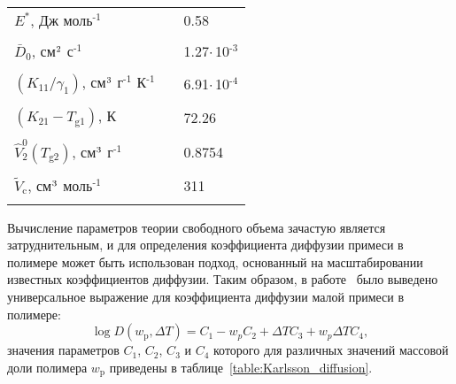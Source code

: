 \begin{table}[h]
\begin{tabular}{l c l}
		$E^*$, Дж моль$^\text{-1}$ & \hspace{1em} & 0.58
		\\ \\ [-1em]
		$\bar{D}_0$, см$^\text{2}$ с$^\text{-1}$ & \hspace{1em} & 1.27\:$\cdot$\,10$^\text{-3}$
		\\ \\ [-1em]
		$(K_{11} / \gamma_1)$, см$^\text{3}$ г$^\text{-1}$ К$^\text{-1}$ & \hspace{1em} & 6.91\:$\cdot$\,10$^\text{-4}$
		\\ \\ [-1em]
		$(K_{21}-T_\mathrm{g1})$, К & \hspace{1em} & 72.26
		\\ \\ [-1em]
		$\hat{V}_2^0(T_\mathrm{g2})$, см$^\text{3}$ г$^\text{-1}$ & \hspace{1em} & 0.8754
		\\ \\ [-1em]
		$\tilde{V}_\mathrm{c}$, см$^\text{3}$ моль$^\text{-1}$ & \hspace{1em} & 311 \\ \hline \hline \vspace{1.5em}
	\end{tabular}
	\label{table:D_free_volume}
\end{table}

Вычисление параметров теории свободного объема зачастую является затруднительным, и для определения коэффициента диффузии примеси в полимере может быть использован подход, основанный на масштабировании известных коэффициентов диффузии. Таким образом, в работе~\cite{Karlsson2001_diffusion} было выведено универсальное выражение для коэффициента диффузии малой примеси в полимере:
\begin{equation} \label{eq:Karlsson_diffusion}
	\log D (w_\mathrm{p}, \Delta T) = C_1 - w_p C_2 + \Delta T C_3 + w_p \Delta T C_4,
\end{equation}
значения параметров $C_1$, $C_2$, $C_3$ и $C_4$ которого для различных значений массовой доли полимера $w_\mathrm{p}$ приведены в таблице~\ref{table:Karlsson_diffusion}.

